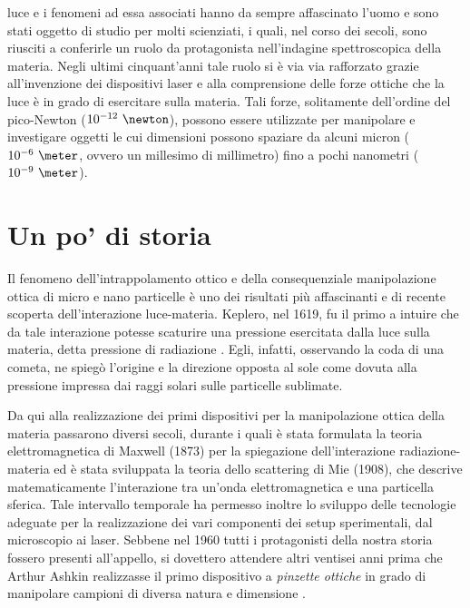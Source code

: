  luce e i fenomeni ad essa associati hanno da sempre affascinato l'uomo e sono stati oggetto di studio per molti scienziati, i quali, nel corso dei secoli, sono riusciti a conferirle un ruolo da protagonista nell'indagine spettroscopica della materia. Negli ultimi cinquant'anni tale ruolo si è via via rafforzato grazie all'invenzione dei dispositivi laser e alla comprensione delle forze ottiche che la luce è in grado di esercitare sulla materia. Tali forze, solitamente dell'ordine del pico-Newton ($10^{-12}~\newton$), possono essere utilizzate per manipolare e investigare oggetti le cui dimensioni possono spaziare da alcuni micron ($10^{-6}~\meter$, ovvero un millesimo di millimetro) fino a pochi nanometri ($10^{-9}~\meter$).

\section*{Un po' di storia}
Il fenomeno dell'intrappolamento ottico e della consequenziale manipolazione ottica di micro e nano particelle è uno dei risultati più affascinanti e di recente scoperta dell'interazione luce-materia.
Keplero, nel 1619, fu il primo a intuire che da tale interazione potesse scaturire una pressione esercitata dalla luce sulla materia, detta pressione di radiazione \cite{lebedew1901untersuchungen,nxcnons1901preliminary}. Egli, infatti, osservando la coda di una cometa, ne spiegò l'origine e la direzione opposta al sole come dovuta alla pressione impressa dai raggi solari sulle particelle sublimate.

Da qui alla realizzazione dei primi dispositivi per la manipolazione ottica della materia passarono diversi secoli, durante i quali è stata formulata la teoria elettromagnetica di Maxwell (1873) per la spiegazione dell'interazione radiazione-materia ed è stata sviluppata la teoria dello scattering di Mie (1908), che descrive matematicamente l'interazione tra un'onda elettromagnetica e una particella sferica. Tale intervallo temporale ha permesso inoltre lo sviluppo delle tecnologie adeguate per la realizzazione dei vari componenti dei setup sperimentali, dal microscopio ai laser.
Sebbene nel 1960 tutti i protagonisti della nostra storia fossero presenti all'appello, si dovettero  attendere altri ventisei anni prima che Arthur Ashkin realizzasse il primo dispositivo a \emph{pinzette ottiche} in grado di manipolare campioni di diversa natura e dimensione \cite{ashkin1970acceleration,ashkin1971optical,ashkin2000history,mcgloin2010forty}.

